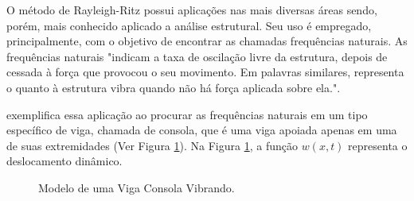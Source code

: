 \documentclass[
	12pt,				%
	openright,			%
    twoside,			%
	a4paper,			%
	english,			%
	french,				%
	spanish,			%
	brazil				%
	]{abntex2}
\numberwithin{lema}{chapter}
\numberwithin{teorema}{chapter}
\numberwithin{definicao}{chapter}
\numberwithin{exemplo}{chapter}
\numberwithin{figure}{chapter}
\begin{document}
O método de Rayleigh-Ritz possui aplicações nas mais diversas áreas sendo, porém, mais conhecido aplicado a análise estrutural. Seu uso é empregado, principalmente, com o objetivo de encontrar as chamadas frequências naturais. As frequências naturais "indicam a taxa de oscilação livre da estrutura, depois de cessada à força que provocou o seu movimento. Em palavras similares, representa o quanto à estrutura vibra quando não há força aplicada sobre ela."\text{ }\cite[p. 1]{Vasquez2015}.

 exemplifica essa aplicação ao procurar as frequências naturais em um tipo específico de viga, chamada de consola, que é uma viga apoiada apenas em uma de suas extremidades (Ver Figura \ref{fig:cantilever}). Na Figura \ref{fig:cantilever}, a função $w(x,t)$ representa o deslocamento dinâmico.

\begin{figure}[h]
	\caption{Modelo de uma Viga Consola Vibrando.}
	\centering
	\label{fig:cantilever}
\end{figure}
\end{document}
